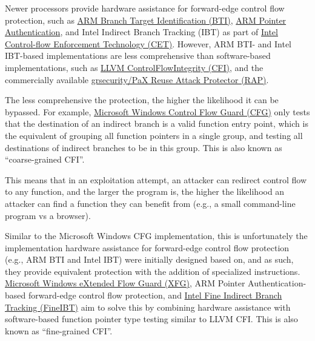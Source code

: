 \documentclass{article}
\begin{document}
Newer processors provide hardware assistance for forward-edge control flow protection, such as \href{https://community.arm.com/arm-community-blogs/b/tools-software-ides-blog/posts/code-reuse-attacks-the-compiler-story}{ARM Branch Target Identification (BTI)}, \href{https://community.arm.com/arm-community-blogs/b/architectures-and-processors-blog/posts/armv8-1-m-pointer-authentication-and-branch-target-identification-extension}{ARM Pointer Authentication}, and Intel Indirect Branch Tracking (IBT) as part of \href{https://www.intel.com/content/www/us/en/developer/articles/technical/technical-look-control-flow-enforcement-technology.html}{Intel Control-flow Enforcement Technology (CET)}. However, ARM BTI- and Intel IBT-based implementations are less comprehensive than software-based implementations, such as \href{https://clang.llvm.org/docs/ControlFlowIntegrity.html}{LLVM ControlFlowIntegrity (CFI)}, and the commercially available \href{https://grsecurity.net/rap_faq}{grsecurity/PaX Reuse Attack Protector (RAP)}.

The less comprehensive the protection, the higher the likelihood it can be bypassed. For example, \href{https://learn.microsoft.com/en-us/windows/win32/secbp/control-flow-guard}{Microsoft Windows Control Flow Guard (CFG)} only tests that the destination of an indirect branch is a valid function entry point, which is the equivalent of grouping all function pointers in a single group, and testing all destinations of indirect branches to be in this group. This is also known as “coarse-grained CFI”.

This means that in an exploitation attempt, an attacker can redirect control flow to any function, and the larger the program is, the higher the likelihood an attacker can find a function they can benefit from (e.g., a small command-line program vs a browser).

Similar to the Microsoft Windows CFG implementation, this is unfortunately the implementation hardware assistance for forward-edge control flow protection (e.g., ARM BTI and Intel IBT) were initially designed based on, and as such, they provide equivalent protection with the addition of specialized instructions. \href{https://query.prod.cms.rt.microsoft.com/cms/api/am/binary/RE37dMC}{Microsoft Windows eXtended Flow Guard (XFG)}, ARM Pointer Authentication-based forward-edge control flow protection, and \href{https://arxiv.org/abs/2303.16353}{Intel Fine Indirect Branch Tracking (FineIBT)} aim to solve this by combining hardware assistance with software-based function pointer type testing similar to LLVM CFI. This is also known as “fine-grained CFI”.
\end{document}
